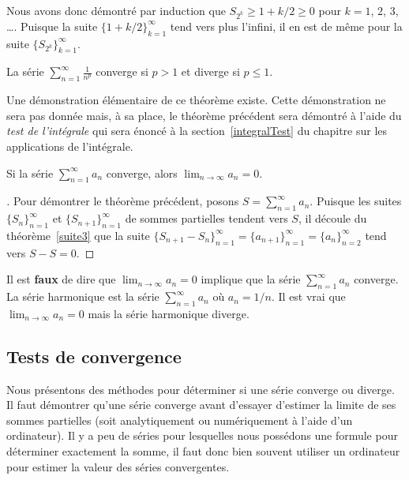 {\begin{egg}[\theory\ \eng]
Nous avons donc démontré par induction que $S_{2^k} \geq 1 + k/2 \geq 0$
pour $k=1$, $2$, $3$, \ldots.  Puisque la suite
$\{1+k/2\}_{k=1}^\infty$ tend vers plus l'infini, il en est de même
pour la suite $\{S_{2^k}\}_{k=1}^\infty$.
\end{egg}

\begin{focus}{\prp}
La série $\displaystyle \sum_{n=1}^\infty \frac{1}{n^p}$ converge si
$p>1$ et diverge si $p\leq 1$.
\label{Pseries}
\end{focus}

\begin{rmk}[\eng]
Une démonstration élémentaire de ce théorème existe.  Cette
démonstration ne sera pas donnée mais, à sa place, le théorème
précédent sera démontré à l'aide du {\em test de l'intégrale} qui sera
énoncé à la section~\ref{integralTest} du chapitre sur les
applications de l'intégrale.
\end{rmk}

\begin{focus}{\thm}
Si la série $\displaystyle \sum_{n=1}^\infty a_n$
converge, alors $\displaystyle \lim_{n\rightarrow \infty} a_n = 0$.
\label{condTC}
\end{focus}

\begin{proof}[\theory]
Pour démontrer le théorème précédent, posons
$\displaystyle S = \sum_{n=1}^\infty a_n$.  Puisque les suites
$\{S_n\}_{n=1}^\infty$ et $\{S_{n+1}\}_{n=1}^\infty$ de
sommes partielles tendent vers $S$, il découle du
théorème~\ref{suite3} que la suite
$\displaystyle \{S_{n+1}-S_n\}_{n=1}^\infty = \{ a_{n+1} \}_{n=1}^\infty
= \{ a_n \}_{n=2}^\infty$
tend vers $S-S=0$.
\end{proof}

\begin{rmk}
Il est {\bfseries faux} de dire que
$\displaystyle \lim_{n\rightarrow \infty} a_n = 0$ implique que la
série $\displaystyle \sum_{n=1}^\infty a_n$ converge.  La série
harmonique est la série $\displaystyle \sum_{n=1}^\infty a_n$ où
$a_n = 1/n$.  Il est vrai que
$\displaystyle \lim_{n\rightarrow \infty} a_n = 0$ mais la série
harmonique diverge.
\end{rmk}

\subsection{Tests de convergence \eng}\label{conv_tests}

Nous présentons des méthodes pour déterminer si une série converge ou
diverge.  Il faut démontrer qu'une série converge avant d'essayer
d'estimer la limite de ses sommes partielles (soit analytiquement ou
numériquement à l'aide d'un ordinateur).  Il y a peu de séries pour
lesquelles nous possédons une formule pour déterminer exactement la somme,
il faut donc bien souvent utiliser un ordinateur pour estimer la
valeur des séries convergentes.

}
